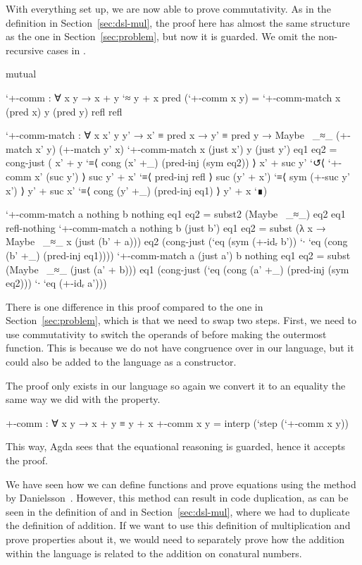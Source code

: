 With everything set up, we are now able to prove commutativity. As in the
definition in Section~\ref{sec:dsl-mul}, the proof here has almost the same
structure as the one in Section~\ref{sec:problem}, but now it is guarded. We
omit the non-recursive cases in .
\begin{code}[hide]
mutual
\end{code}
\begin{code}
  `+-comm : ∀ x y → x + y `≈ y + x
  pred (`+-comm x y) =
    `+-comm-match x (pred x) y (pred y) refl refl

  `+-comm-match :
    ∀ x x' y y' → x' ≡ pred x → y' ≡ pred y →
    Maybe~ _≈_ (+-match x' y) (+-match y' x)
  `+-comm-match x (just x') y (just y') eq1 eq2 =
    cong-just
      ( x' + y         `≡⟨ cong (x' +_) (pred-inj (sym eq2)) ⟩
        x' + suc y'    `↺⟨ `+-comm x' (suc y') ⟩
        suc y' + x'    `≡⟨ pred-inj refl ⟩
        suc (y' + x')  `≡⟨ sym (+-suc y' x') ⟩
        y' + suc x'    `≡⟨ cong (y' +_) (pred-inj eq1) ⟩
        y' + x         `∎)
\end{code}
\begin{code}[hide]
  `+-comm-match a nothing b nothing eq1 eq2 = subst2 (Maybe~ _≈_) eq2 eq1 refl-nothing
  `+-comm-match a nothing b (just b') eq1 eq2 = subst (λ x → Maybe~ _≈_ x (just (b' + a))) eq2 (cong-just (`eq (sym (+-idᵣ b')) `∙ `eq (cong (b' +_) (pred-inj eq1))))
  `+-comm-match a (just a') b nothing eq1 eq2 = subst (Maybe~ _≈_ (just (a' + b))) eq1 (cong-just (`eq (cong (a' +_) (pred-inj (sym eq2))) `∙ `eq (+-idᵣ a')))
\end{code}
There is one difference in this proof compared to the one in
Section~\ref{sec:problem}, which is that we need to swap two steps. First, we
need to use commutativity to switch the operands of \AgdaFunction{\_+\_} before
making  the outermost function. This is because we do not have
congruence over  in our language, but it could also be added
to the language as a constructor.

The proof only exists in our language so again we convert it to an equality the
same way we did with the  property.
\begin{code}
+-comm : ∀ x y → x + y ≡ y + x
+-comm x y = interp (`step (`+-comm x y))
\end{code}
This way, Agda sees that the equational reasoning is guarded, hence it accepts
the proof.

We have seen how we can define functions and prove equations using the method by
Danielsson~\cite{danielsson-beating}. However, this method can result in code
duplication, as can be seen in the definition of  and
 in Section~\ref{sec:dsl-mul}, where we had to
duplicate the definition of addition. If we want to use this definition of
multiplication and prove properties about it, we would need to separately prove
how the addition within the language is related to the addition on conatural
numbers.

